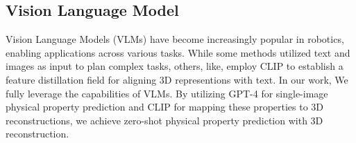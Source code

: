 \subsection{Vision Language Model}
Vision Language Models (VLMs)\cite{ilharco_gabriel_2021_5143773,zhu2023minigpt,li2023blip} have become increasingly popular in robotics, enabling applications across various tasks\cite{huang2023voxposer,moo2023arxiv,chen23polarnet,rt22023arxiv,qin2024langsplat,zhou2024feature,kerr2023lerf,zhou2024navgpt}. While some methods\cite{zhou2024navgpt,huang2023voxposer} utilized text and images as input to plan complex tasks, others, like\cite{kerr2023lerf,qin2024langsplat}, employ CLIP\cite{ilharco_gabriel_2021_5143773} to establish a feature distillation field for aligning 3D representions with text. In our work, We fully leverage the capabilities of VLMs. By utilizing GPT-4 for single-image physical property prediction and CLIP\cite{ilharco_gabriel_2021_5143773} for mapping these properties to 3D reconstructions, we achieve zero-shot physical property prediction with 3D reconstruction.

